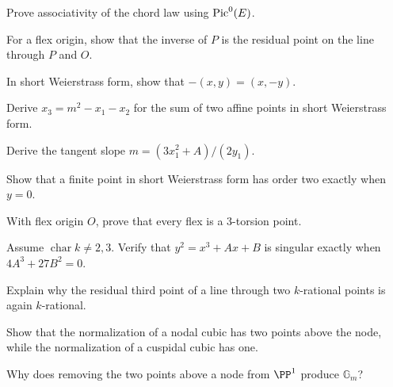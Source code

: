 \begin{exercise}\label{exr:vi43-13}
Prove associativity of the chord law using \(\operatorname{Pic}^0(E)\).
\end{exercise}

\begin{exercise}\label{exr:vi43-14}
For a flex origin, show that the inverse of \(P\) is the residual point on the line through \(P\) and \(O\).
\end{exercise}

\begin{exercise}\label{exr:vi43-15}
In short Weierstrass form, show that \(-(x,y)=(x,-y)\).
\end{exercise}

\begin{exercise}\label{exr:vi43-16}
Derive \(x_3=m^2-x_1-x_2\) for the sum of two affine points in short Weierstrass form.
\end{exercise}

\begin{exercise}\label{exr:vi43-17}
Derive the tangent slope \(m=(3x_1^2+A)/(2y_1)\).
\end{exercise}

\begin{exercise}\label{exr:vi43-18}
Show that a finite point in short Weierstrass form has order two exactly when \(y=0\).
\end{exercise}

\begin{exercise}\label{exr:vi43-19}
With flex origin \(O\), prove that every flex is a \(3\)-torsion point.
\end{exercise}

\begin{exercise}\label{exr:vi43-20}
Assume \(\operatorname{char}k\neq2,3\).  Verify that \(y^2=x^3+Ax+B\) is singular exactly when \(4A^3+27B^2=0\).
\end{exercise}

\begin{exercise}\label{exr:vi43-21}
Explain why the residual third point of a line through two \(k\)-rational points is again \(k\)-rational.
\end{exercise}

\begin{exercise}\label{exr:vi43-22}
Show that the normalization of a nodal cubic has two points above the node, while the normalization of a cuspidal cubic has one.
\end{exercise}

\begin{exercise}\label{exr:vi43-23}
Why does removing the two points above a node from \(\PP^1\) produce \(\mathbb G_m\)?
\end{exercise}

